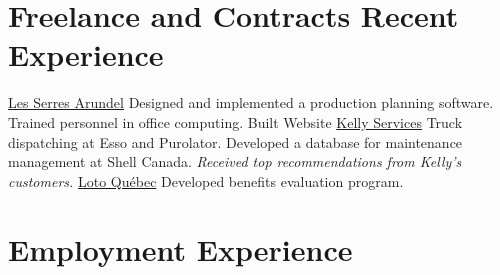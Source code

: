\documentclass[letterpaper]{twentysecondcv} %
\begin{document}
\section{Freelance and Contracts Recent Experience}

\begin{twenty} %
    {\href{http://lesserresarundel.dmeilleur.com/}{Les Serres Arundel}}
    {Designed and implemented a production planning software.\\
    Trained personnel in office computing. Built Website}
    {\href{https://www.kellyservices.ca/}{Kelly Services}}
    {Truck dispatching at Esso and Purolator. Developed a database for maintenance management
    at Shell Canada. \emph{Received top recommendations from Kelly's customers.}}
    {\href{https://societe.lotoquebec.com}{Loto Québec}}
    {Developed benefits evaluation program.}
\end{twenty}

%


\section{Employment Experience}
\end{document}
